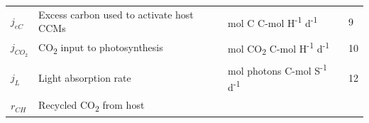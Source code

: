 \documentclass[]{elsarticle} %
\begin{document}
\begin{longtable}[]{@{}llll@{}}
\begin{minipage}[t]{0.09\columnwidth}
\(j_{eC}\)\strut
\end{minipage} & \begin{minipage}[t]{0.44\columnwidth}\raggedright\strut
Excess carbon used to activate host CCMs\strut
\end{minipage} & \begin{minipage}[t]{0.26\columnwidth}\raggedright\strut
mol C C-mol H\textsuperscript{-1} d\textsuperscript{-1}\strut
\end{minipage} & \begin{minipage}[t]{0.09\columnwidth}\raggedright\strut
9\strut
\end{minipage}\tabularnewline
\begin{minipage}[t]{0.09\columnwidth}\raggedright\strut
\(j_{CO_2}\)\strut
\end{minipage} & \begin{minipage}[t]{0.44\columnwidth}\raggedright\strut
CO\textsubscript{2} input to photosynthesis\strut
\end{minipage} & \begin{minipage}[t]{0.26\columnwidth}\raggedright\strut
mol CO\textsubscript{2} C-mol H\textsuperscript{-1}
d\textsuperscript{-1}\strut
\end{minipage} & \begin{minipage}[t]{0.09\columnwidth}\raggedright\strut
10\strut
\end{minipage}\tabularnewline
\begin{minipage}[t]{0.09\columnwidth}\raggedright\strut
\(j_L\)\strut
\end{minipage} & \begin{minipage}[t]{0.44\columnwidth}\raggedright\strut
Light absorption rate\strut
\end{minipage} & \begin{minipage}[t]{0.26\columnwidth}\raggedright\strut
mol photons C-mol S\textsuperscript{-1} d\textsuperscript{-1}\strut
\end{minipage} & \begin{minipage}[t]{0.09\columnwidth}\raggedright\strut
12\strut
\end{minipage}\tabularnewline
\begin{minipage}[t]{0.09\columnwidth}\raggedright\strut
\(r_{CH}\)\strut
\end{minipage} & \begin{minipage}[t]{0.44\columnwidth}\raggedright\strut
Recycled CO\textsubscript{2} from host\strut
\end{minipage} & \begin{minipage}[t]{0.26\columnwidth}\raggedright\strut

\end{minipage}
\end{longtable}
\end{document}
